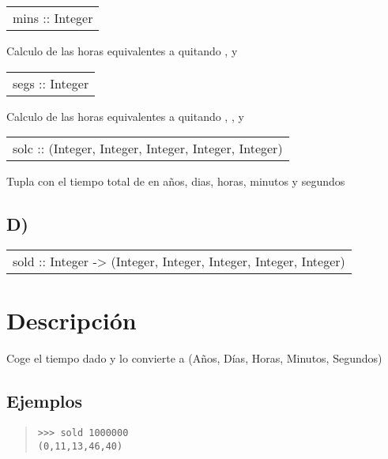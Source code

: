 \begin{haddockdesc}
\item[\begin{tabular}{@{}l}
mins :: Integer
\end{tabular}]
{\haddockbegindoc
Calculo de las horas equivalentes a  quitando ,  y \par}
\end{haddockdesc}
\begin{haddockdesc}
\item[\begin{tabular}{@{}l}
segs :: Integer
\end{tabular}]
{\haddockbegindoc
Calculo de las horas equivalentes a  quitando , ,  y \par}
\end{haddockdesc}
\begin{haddockdesc}
\item[\begin{tabular}{@{}l}
solc :: (Integer, Integer, Integer, Integer, Integer)
\end{tabular}]
{\haddockbegindoc
Tupla con el tiempo total de  en años, dias, horas, minutos y segundos\par}
\end{haddockdesc}
\subsection{D)}
\begin{haddockdesc}
\item[\begin{tabular}{@{}l}
sold :: Integer -> (Integer, Integer, Integer, Integer, Integer)
\end{tabular}]
{\haddockbegindoc
\section*{Descripción}
Coge el tiempo dado y lo convierte a (Años, Días, Horas, Minutos, Segundos)\par
\subsection*{Ejemplos}
\begin{quote}
{\haddockverb\begin{verbatim}
>>> sold 1000000
(0,11,13,46,40)

\end{verbatim}}
\end{quote}}
\end{haddockdesc}
